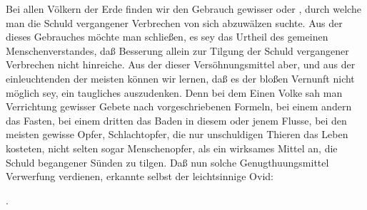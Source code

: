 Bei allen Völkern der Erde finden wir den Gebrauch gewisser  oder , durch welche man die Schuld vergangener Verbrechen von sich abzuwälzen suchte. Aus der  dieses Gebrauches möchte man schließen, es sey das Urtheil des gemeinen Menschenverstandes, daß Besserung allein zur Tilgung der Schuld vergangener Verbrechen nicht hinreiche. Aus der  dieser Versöhnungsmittel aber, und aus der einleuchtenden  der meisten können wir lernen, daß es der bloßen Vernunft nicht möglich sey, ein taugliches auszudenken. Denn bei dem Einen Volke sah man Verrichtung gewisser Gebete nach vorgeschriebenen Formeln, bei einem andern das Fasten, bei einem dritten das Baden in diesem oder jenem Flusse, bei den meisten gewisse Opfer, Schlachtopfer, die nur unschuldigen Thieren das Leben kosteten, nicht selten sogar Menschenopfer, als ein wirksames Mittel an, die Schuld begangener Sünden zu tilgen. Daß nun solche Genugthuungsmittel Verwerfung verdienen, erkannte selbst der leichtsinnige Ovid: \par
{}\par
{}\par
\mbox{}\hfill {}.

